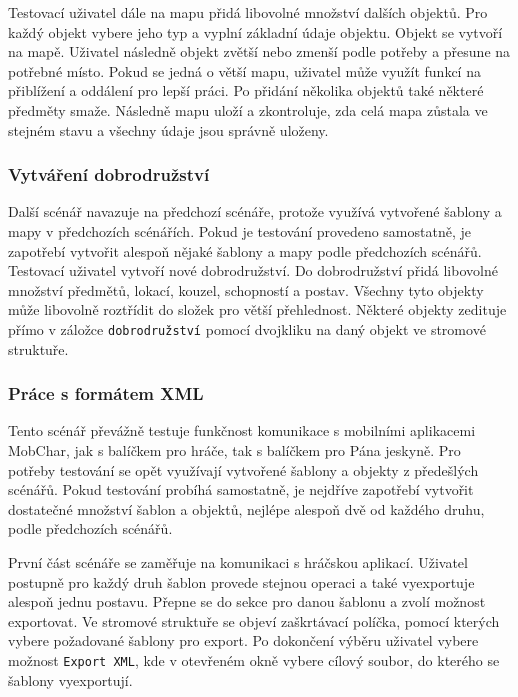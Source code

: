 \documentclass[thesis=B,czech]{resources/FITthesis}[2012/06/26]
\begin{document}
Testovací uživatel dále na mapu přidá libovolné množství dalších objektů. Pro každý objekt vybere jeho typ a vyplní základní údaje objektu. Objekt se vytvoří na mapě. Uživatel následně objekt zvětší nebo zmenší podle potřeby a přesune na potřebné místo. Pokud se jedná o větší mapu, uživatel může využít funkcí na přiblížení a oddálení pro lepší práci. Po přidání několika objektů také některé předměty smaže. Následně mapu uloží a zkontroluje, zda celá mapa zůstala ve stejném stavu a všechny údaje jsou správně uloženy.

\subsubsection{Vytváření dobrodružství}
Další scénář navazuje na předchozí scénáře, protože využívá vytvořené šablony a mapy v předchozích scénářích. Pokud je testování provedeno samostatně, je zapotřebí vytvořit alespoň nějaké šablony a mapy podle předchozích scénářů. Testovací uživatel vytvoří nové dobrodružství. Do dobrodružství přidá libovolné množství předmětů, lokací, kouzel, schopností a postav. Všechny tyto objekty může libovolně roztřídit do složek pro větší přehlednost. Některé objekty zedituje přímo v záložce \texttt{dobrodružství} pomocí dvojkliku na daný objekt ve stromové struktuře.

\subsubsection{Práce s formátem XML}
Tento scénář převážně testuje funkčnost komunikace s mobilními aplikacemi MobChar, jak s balíčkem pro hráče, tak s balíčkem pro Pána jeskyně. Pro potřeby testování se opět využívají vytvořené šablony a objekty z předešlých scénářů. Pokud testování probíhá samostatně, je nejdříve zapotřebí vytvořit dostatečné množství šablon a objektů, nejlépe alespoň dvě od každého druhu, podle předchozích scénářů. \par

První část scénáře se zaměřuje na komunikaci s hráčskou aplikací. Uživatel postupně pro každý druh šablon provede stejnou operaci a také vyexportuje alespoň jednu postavu. Přepne se do sekce pro danou šablonu a zvolí možnost exportovat. Ve stromové struktuře se objeví zaškrtávací políčka, pomocí kterých vybere požadované šablony pro export. Po dokončení výběru uživatel vybere možnost \texttt{Export XML}, kde v otevřeném okně vybere cílový soubor, do kterého se šablony vyexportují. \par
\end{document}
